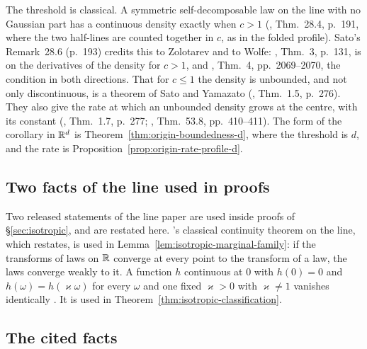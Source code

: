 The threshold is classical. A symmetric self-decomposable law on the line with no Gaussian part
has a continuous density exactly when $c > 1$ (, Thm.~28.4, p.~191, where
the two half-lines are counted together in $c$, as in the folded profile). Sato's Remark~28.6
(p.~193) credits this to Zolotarev and to Wolfe: , Thm.~3, p.~131,
is on the derivatives of the density for $c > 1$, and , Thm.~4,
pp.~2069--2070, the condition in both directions. That for $c \le 1$ the density is unbounded,
and not only discontinuous, is a theorem of Sato and Yamazato (,
Thm.~1.5, p.~276). They also give the rate at which an unbounded density grows at the centre,
with its constant (, Thm.~1.7, p.~277; ,
Thm.~53.8, pp.~410--411). The form of the corollary in $\mathbb{R}^d$ is
Theorem~\ref{thm:origin-boundedness-d}, where the threshold is $d$, and the rate is
Proposition~\ref{prop:origin-rate-profile-d}.

\subsection{Two facts of the line used in proofs}\label{sec:line-facts}

Two released statements of the line paper are used inside proofs of \S\ref{sec:isotropic}, and are restated
here. \Levy's classical continuity theorem on the line, which  restates, is used
in Lemma~\ref{lem:isotropic-marginal-family}: if the transforms of laws on $\mathbb{R}$ converge at every
point to the transform of a law, the laws converge weakly to it. A function $h$ continuous at $0$ with
$h(0) = 0$ and $h(\omega) = h(\varkappa\omega)$ for every $\omega$ and one fixed $\varkappa > 0$
with $\varkappa \ne 1$ vanishes identically . It is used in
Theorem~\ref{thm:isotropic-classification}.

\subsection{The cited facts}\label{sec:cited-facts}

